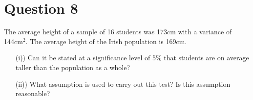 \documentclass[a4paper,12pt]{article}
\begin{document}
\section*{Question 8}
The average height of a sample of 16 students was 173cm with a variance of 144cm$^2$. The average height of the Irish population is 169cm. 
\begin{itemize}
\item[(i))] Can it be stated at a significance level of 5\% that students are on average taller than the population as a whole? 
\item[(ii))] What assumption is used to carry out this test? Is this assumption reasonable?
\end{itemize}
\end{document}
